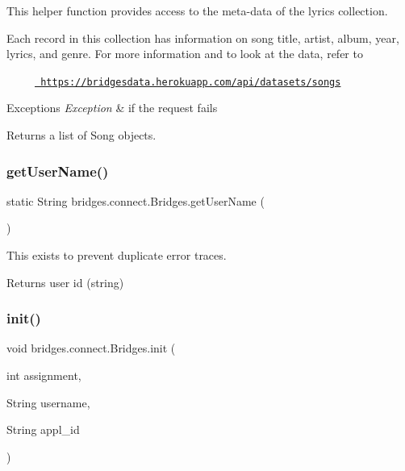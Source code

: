 This helper function provides access to the meta-\/data of the lyrics collection.

Each record in this collection has information on song title, artist, album, year, lyrics, and genre. For more information and to look at the data, refer to 

~~~~~\href{https://bridgesdata.herokuapp.com/api/datasets/songs}{\texttt{ https\+://bridgesdata.\+herokuapp.\+com/api/datasets/songs}} 


\begin{DoxyExceptions}{Exceptions}
{\em Exception} & if the request fails\\
\hline
\end{DoxyExceptions}
\begin{DoxyReturn}{Returns}
a list of Song objects. 
\end{DoxyReturn}
\mbox{\label{classbridges_1_1connect_1_1_bridges_a75f047cda3100e0cfa88378293c12961}} 
\subsubsection{\texorpdfstring{getUserName()}{getUserName()}}
{\footnotesize\ttfamily static String bridges.\+connect.\+Bridges.\+get\+User\+Name (\begin{DoxyParamCaption}{ }\end{DoxyParamCaption})\hspace{0.3cm}{\ttfamily [static]}}

This exists to prevent duplicate error traces.

\begin{DoxyReturn}{Returns}
user id (string) 
\end{DoxyReturn}
\mbox{\label{classbridges_1_1connect_1_1_bridges_a87aa73367a43cfc8b3ae5e4926ea4895}} 
\subsubsection{\texorpdfstring{init()}{init()}}
{\footnotesize\ttfamily void bridges.\+connect.\+Bridges.\+init (\begin{DoxyParamCaption}\item[{int}]{assignment,  }\item[{String}]{username,  }\item[{String}]{appl\+\_\+id }\end{DoxyParamCaption})}

